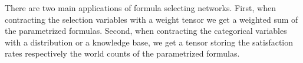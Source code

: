 










%










There are two main applications of formula selecting networks.
First, when contracting the selection variables with a weight tensor we get a weighted sum of the parametrized formulas.
Second, when contracting the categorical variables with a distribution or a knowledge base, we get a tensor storing the satisfaction rates respectively the world counts of the parametrized formulas.

